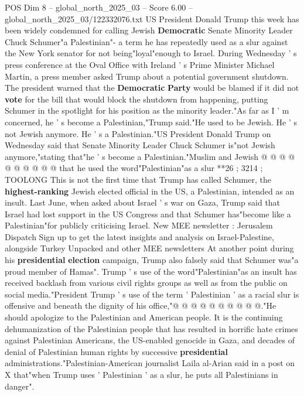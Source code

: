 \begin{textsample}{POS Dim 8 – global\_north\_2025\_03 – Score 6.00 – global\_north\_2025\_03/122332076.txt}  \label{ex:f8_pos_333}
US President Donald Trump this week has been widely condemned for calling Jewish \textbf{Democratic} Senate Minority Leader Chuck Schumer"a Palestinian"- a term he has repeatedly used as a slur against the New York senator for not being"loyal"enough to Israel.
During Wednesday ' s press conference at the Oval Office with Ireland ' s Prime Minister Michael Martin, a press member asked Trump about a potential government shutdown.
The president warned that the \textbf{Democratic} \textbf{Party} would be blamed if it did not \textbf{vote} for the bill that would block the shutdown from happening, putting Schumer in the spotlight for his position as the minority leader."As far as I ' m concerned, he ' s become a Palestinian,"Trump said."He used to be Jewish.
He ' s not Jewish anymore.
He ' s a Palestinian."US President Donald Trump on Wednesday said that Senate Minority Leader Chuck Schumer is"not Jewish anymore,"stating that"he ' s become a Palestinian."Muslim and Jewish @ @ @ @ @ @ @ @ @ @ that he used the word"Palestinian"as a slur **26 ; 3214 ; TOOLONG This is not the first time that Trump has called Schumer, the \textbf{highest-ranking} Jewish elected official in the US, a Palestinian, intended as an insult.
Last June, when asked about Israel ' s war on Gaza, Trump said that Israel had lost support in the US Congress and that Schumer has"become like a Palestinian"for publicly criticising Israel.
New MEE newsletter : Jerusalem Dispatch Sign up to get the latest insights and analysis on Israel-Palestine, alongside Turkey Unpacked and other MEE newsletters At another point during his \textbf{presidential} \textbf{election} campaign, Trump also falsely said that Schumer was"a proud member of Hamas".
Trump ' s use of the word"Palestinian"as an insult has received backlash from various civil rights groups as well as from the public on social media."President Trump ' s use of the term ' Palestinian ' as a racial slur is offensive and beneath the dignity of his office,"@ @ @ @ @ @ @ @ @ @."He should apologize to the Palestinian and American people.
It is the continuing dehumanization of the Palestinian people that has resulted in horrific hate crimes against Palestinian Americans, the US-enabled genocide in Gaza, and decades of denial of Palestinian human rights by successive \textbf{presidential} administrations."Palestinian-American journalist Laila al-Arian said in a post on X that"when Trump uses ' Palestinian ' as a slur, he puts all Palestinians in danger".

\end{textsample}

